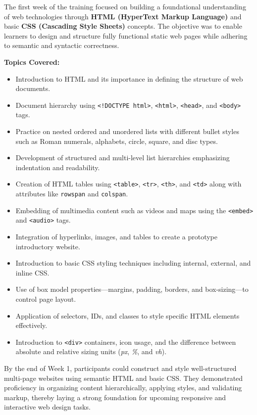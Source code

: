 \documentclass[a4paper,12pt,oneside]{report}
\numberwithin{equation}{chapter}
\numberwithin{figure}{chapter}
\numberwithin{table}{chapter}
\begin{document}
The first week of the training focused on building a foundational understanding of web technologies through \textbf{HTML (HyperText Markup Language)} and basic \textbf{CSS (Cascading Style Sheets)} concepts. The objective was to enable learners to design and structure fully functional static web pages while adhering to semantic and syntactic correctness.

\textbf{Topics Covered:}
\begin{itemize}
    \item Introduction to HTML and its importance in defining the structure of web documents.
    \item Document hierarchy using \texttt{<!DOCTYPE html>}, \texttt{<html>}, \texttt{<head>}, and \texttt{<body>} tags.
    \item Practice on nested ordered and unordered lists with different bullet styles such as Roman numerals, alphabets, circle, square, and disc types.
    \item Development of structured and multi-level list hierarchies emphasizing indentation and readability.
    \item Creation of HTML tables using \texttt{<table>}, \texttt{<tr>}, \texttt{<th>}, and \texttt{<td>} along with attributes like \texttt{rowspan} and \texttt{colspan}.
    \item Embedding of multimedia content such as videos and maps using the \texttt{<embed>} and \texttt{<audio>} tags.
    \item Integration of hyperlinks, images, and tables to create a prototype introductory website.
    \item Introduction to basic CSS styling techniques including internal, external, and inline CSS.
    \item Use of box model properties—margins, padding, borders, and box-sizing—to control page layout.
    \item Application of selectors, IDs, and classes to style specific HTML elements effectively.
    \item Introduction to \texttt{<div>} containers, icon usage, and the difference between absolute and relative sizing units (\textit{px}, \textit{\%}, and \textit{vh}).
\end{itemize}

By the end of Week 1, participants could construct and style well-structured multi-page websites using semantic HTML and basic CSS. They demonstrated proficiency in organizing content hierarchically, applying styles, and validating markup, thereby laying a strong foundation for upcoming responsive and interactive web design tasks.
\end{document}
